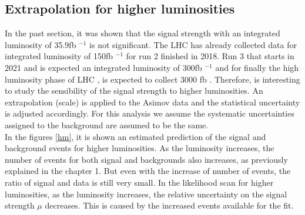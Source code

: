 \begin{linenumbers}
	\section{Extrapolation for higher luminosities}
	In the past section, it was shown that the signal strength  with an integrated luminosity of 35.9fb $^{-1}$ is not significant. The LHC has already collected data for integrated luminosity of 150fb $^{-1}$ for run 2 finished in 2018. Run 3 that starts in 2021 and is expected an integrated luminosity of 300fb $^{-1}$ and for finally the high luminosity phase of LHC , is expected to collect 3000 fb . Therefore, is interesting to study the sensibility of the signal  strength to higher luminosities. 
	An extrapolation (scale) is applied to the Asimov data and the statistical uncertainty is adjusted accordingly. For this analysis we assume the systematic uncertainties assigned to the background are assumed to be the same.
	\\
	
	In the figures \ref{hm}, it is shown an estimated prediction of the signal and background events for higher luminosities. As the luminosity increases, the number of events for both signal and backgrounds also increases, as previously explained in the chapter 1. But even with the increase of number of events, the ratio of signal and data is still very small.  In the likelihood scan for higher luminosities, as the luminosity increases, the relative uncertainty on the signal strength $\mu$ decreases. This is caused by the increased events available for the fit. 
	\pagebreak
	

\end{linenumbers}
